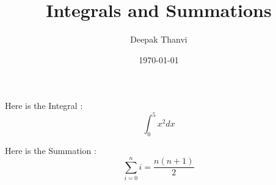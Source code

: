 \documentclass{article}
\title{Integrals and Summations}
\author{Deepak Thanvi}
\date{\today}
\begin{document}
\maketitle


Here is the Integral :
\[
    \int_{0}^{5} x^2 dx
\]

Here is the Summation :
$$
	\sum_{i=0}^{n} i = \frac{n(n+1)}{2}
$$
\end{document}

